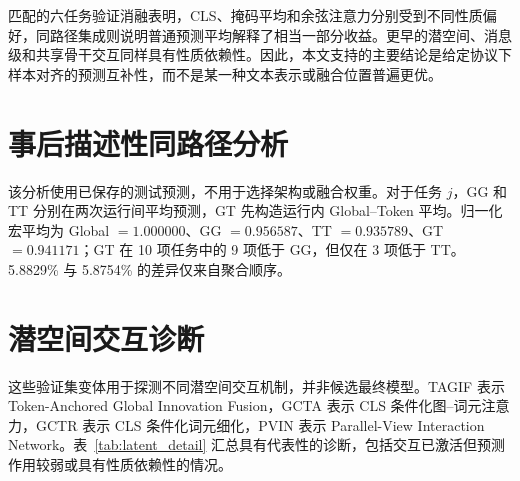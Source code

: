\documentclass[a4paper,fleqn]{cas-sc}
\begin{document}
匹配的六任务验证消融表明，CLS、掩码平均和余弦注意力分别受到不同性质偏好，同路径集成则说明普通预测平均解释了相当一部分收益。更早的潜空间、消息级和共享骨干交互同样具有性质依赖性。因此，本文支持的主要结论是给定协议下样本对齐的预测互补性，而不是某一种文本表示或融合位置普遍更优。

\appendix
\setcounter{topnumber}{5}\setcounter{bottomnumber}{5}\setcounter{totalnumber}{10}
\renewcommand{\topfraction}{0.95}\renewcommand{\bottomfraction}{0.95}\renewcommand{\textfraction}{0.05}\renewcommand{\floatpagefraction}{0.10}
\section{事后描述性同路径分析}
该分析使用已保存的测试预测，不用于选择架构或融合权重。对于任务 $j$，GG 和 TT 分别在两次运行间平均预测，GT 先构造运行内 Global--Token 平均。归一化宏平均为 Global $=1.000000$、GG $=0.956587$、TT $=0.935789$、GT $=0.941171$；GT 在 10 项任务中的 9 项低于 GG，但仅在 3 项低于 TT。5.8829\% 与 5.8754\% 的差异仅来自聚合顺序。

\section{潜空间交互诊断}\label{app:latent}
这些验证集变体用于探测不同潜空间交互机制，并非候选最终模型。TAGIF 表示 Token-Anchored Global Innovation Fusion，GCTA 表示 CLS 条件化图--词元注意力，GCTR 表示 CLS 条件化词元细化，PVIN 表示 Parallel-View Interaction Network。表~\ref{tab:latent_detail} 汇总具有代表性的诊断，包括交互已激活但预测作用较弱或具有性质依赖性的情况。
\begin{table}[!htbp]\caption{潜空间交互变体的验证集诊断。所有数值均来自验证集；这些变体不进行测试评估。}\label{tab:latent_detail}\centering\scriptsize
{}\end{table}
\end{document}
